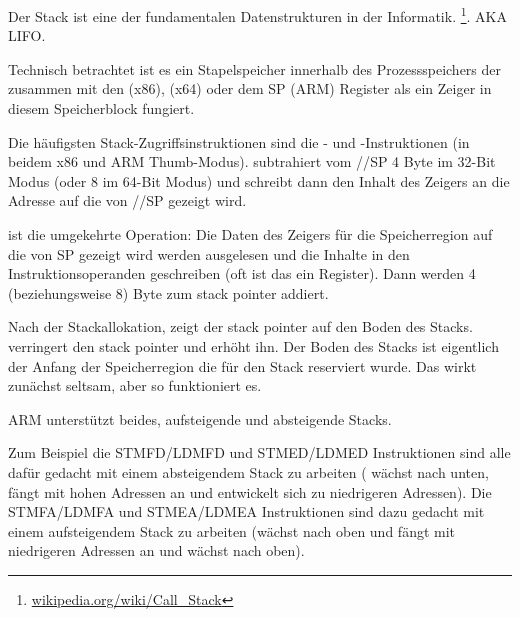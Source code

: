 \mysection{\Stack}
\label{sec:stack}
\myindex{\Stack}

Der Stack ist eine der fundamentalen Datenstrukturen in der Informatik.
\footnote{\href{http://go.yurichev.com/17119}{wikipedia.org/wiki/Call\_Stack}}.
\ac{AKA} \ac{LIFO}.

Technisch betrachtet ist es ein Stapelspeicher innerhalb des Prozessspeichers der zusammen mit den \ESP (x86), \RSP (x64) oder dem \ac{SP} (ARM) Register als ein Zeiger in diesem Speicherblock fungiert.


Die häufigsten Stack-Zugriffsinstruktionen sind die \PUSH- und \POP-Instruktionen (in beidem x86 und ARM Thumb-Modus). \PUSH subtrahiert vom \ESP/\RSP/\ac{SP} 4 Byte im 32-Bit Modus (oder 8 im 64-Bit Modus) und schreibt dann den Inhalt des Zeigers an die Adresse auf die von \ESP/\RSP/\ac{SP} gezeigt wird.

\POP ist die umgekehrte Operation: Die Daten des Zeigers für die Speicherregion auf die von \ac{SP}
gezeigt wird werden ausgelesen und die Inhalte in den Instruktionsoperanden geschreiben (oft ist das ein Register). Dann werden 4 (beziehungsweise 8) Byte zum \gls{stack pointer} addiert.

Nach der Stackallokation, zeigt der \gls{stack pointer} auf den Boden des Stacks.
\PUSH verringert den \gls{stack pointer} und \POP erhöht ihn.
Der Boden des Stacks ist eigentlich der Anfang der Speicherregion die für den Stack reserviert wurde.
Das wirkt zunächst seltsam, aber so funktioniert es.

ARM unterstützt beides, aufsteigende und absteigende Stacks.


Zum Beispiel die \ac{STMFD}/\ac{LDMFD} und \ac{STMED}/\ac{LDMED} Instruktionen sind alle dafür gedacht mit einem absteigendem Stack zu arbeiten ( wächst nach unten, fängt mit hohen Adressen an und entwickelt sich zu niedrigeren Adressen). Die \ac{STMFA}/\ac{LDMFA} und \ac{STMEA}/\ac{LDMEA} Instruktionen sind dazu gedacht mit einem aufsteigendem Stack zu arbeiten (wächst nach oben und fängt mit niedrigeren Adressen an und wächst nach oben).

